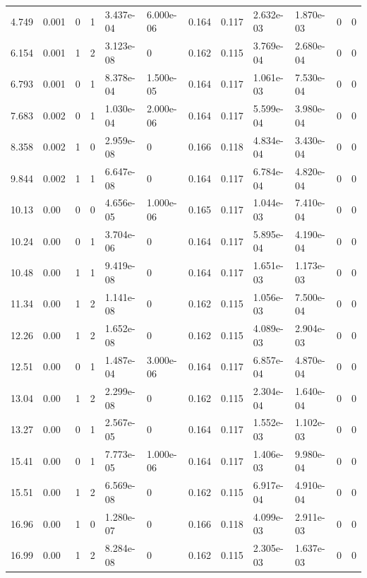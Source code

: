\documentclass[preview]{standalone}
\begin{document}
{{\begin{tabular}{L{1.2cm}C{1.2cm} C{0.3cm}C{0.5cm} C{1.4cm}C{1.4cm} C{1.4cm}C{1.4cm} C{1.6cm}C{1.6cm} C{1.6cm}C{1.6cm}}
  4.749  &  0.001  & 0     &  1 &  3.437e-04  & 6.000e-06  &  0.164&   0.117& 2.632e-03 & 1.870e-03   &  0 & 0  \\ 
  6.154  &  0.001  & 1     &  2 &  3.123e-08  & 0  &  0.162&   0.115& 3.769e-04 & 2.680e-04   &  0 & 0  \\ 
  6.793  &  0.001  & 0     &  1 &  8.378e-04  & 1.500e-05  &  0.164&   0.117& 1.061e-03 & 7.530e-04   &  0 & 0  \\ 
  7.683  &  0.002  & 0     &  1 &  1.030e-04  & 2.000e-06  &  0.164&   0.117& 5.599e-04 & 3.980e-04   &  0 & 0  \\ 
  8.358  &  0.002  & 1     &  0 &  2.959e-08  & 0  &  0.166&   0.118& 4.834e-04 & 3.430e-04   &  0 & 0  \\ 
  9.844  &  0.002  & 1     &  1 &  6.647e-08  & 0  &  0.164&   0.117& 6.784e-04 & 4.820e-04   &  0 & 0  \\ 
  10.13  &  0.00  & 0     &  0 &  4.656e-05  & 1.000e-06  &  0.165&   0.117& 1.044e-03 & 7.410e-04   &  0 & 0  \\ 
  10.24  &  0.00  & 0     &  1 &  3.704e-06  & 0  &  0.164&   0.117& 5.895e-04 & 4.190e-04   &  0 & 0  \\ 
  10.48  &  0.00  & 1     &  1 &  9.419e-08  & 0  &  0.164&   0.117& 1.651e-03 & 1.173e-03   &  0 & 0  \\ 
  11.34  &  0.00  & 1     &  2 &  1.141e-08  & 0  &  0.162&   0.115& 1.056e-03 & 7.500e-04   &  0 & 0  \\ 
  12.26  &  0.00  & 1     &  2 &  1.652e-08  & 0  &  0.162&   0.115& 4.089e-03 & 2.904e-03   &  0 & 0  \\ 
  12.51  &  0.00  & 0     &  1 &  1.487e-04  & 3.000e-06  &  0.164&   0.117& 6.857e-04 & 4.870e-04   &  0 & 0  \\ 
  13.04  &  0.00  & 1     &  2 &  2.299e-08  & 0  &  0.162&   0.115& 2.304e-04 & 1.640e-04   &  0 & 0  \\ 
  13.27  &  0.00  & 0     &  1 &  2.567e-05  & 0  &  0.164&   0.117& 1.552e-03 & 1.102e-03   &  0 & 0  \\ 
  15.41  &  0.00  & 0     &  1 &  7.773e-05  & 1.000e-06  &  0.164&   0.117& 1.406e-03 & 9.980e-04   &  0 & 0  \\ 
  15.51  &  0.00  & 1     &  2 &  6.569e-08  & 0  &  0.162&   0.115& 6.917e-04 & 4.910e-04   &  0 & 0  \\ 
  16.96  &  0.00  & 1     &  0 &  1.280e-07  & 0  &  0.166&   0.118& 4.099e-03 & 2.911e-03   &  0 & 0  \\ 
  16.99  &  0.00  & 1     &  2 &  8.284e-08  & 0  &  0.162&   0.115& 2.305e-03 & 1.637e-03   &  0 & 0  \\ 

\end{tabular}}}
\end{document}
